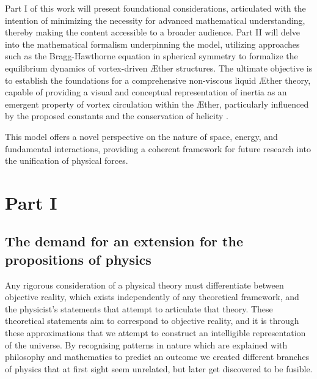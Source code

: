 \documentclass[a4paper,10pt]{article}
\begin{document}
    Part I of this work will present foundational considerations, articulated with the intention of minimizing the necessity for advanced mathematical understanding, thereby making the content accessible to a broader audience. Part II will delve into the mathematical formalism underpinning the model, utilizing approaches such as the Bragg-Hawthorne equation in spherical symmetry \cite{keller2024} to formalize the equilibrium dynamics of vortex-driven \AE ther structures. The ultimate objective is to establish the foundations for a comprehensive non-viscous liquid \AE ther theory, capable of providing a visual and conceptual representation of inertia as an emergent property of vortex circulation within the \AE ther, particularly influenced by the proposed constants and the conservation of helicity \cite{kleckner2016}.





    This model offers a novel perspective on the nature of space, energy, and fundamental interactions, providing a coherent framework for future research into the unification of physical forces.





    \section{Part I}\label{sec:part-i}
    \subsection{The demand for an extension for the propositions of physics}\label{sec:introduction}

    Any rigorous consideration of a physical theory must differentiate between objective reality, which exists independently of any theoretical framework, and the physicist's statements that attempt to articulate that theory. These theoretical statements aim to correspond to objective reality, and it is through these approximations that we attempt to construct an intelligible representation of the universe. By recognising patterns in nature which are explained with philosophy and mathematics to predict an outcome we created different branches of physics that at first sight seem unrelated, but later get discovered to be fusible.
\end{document}
